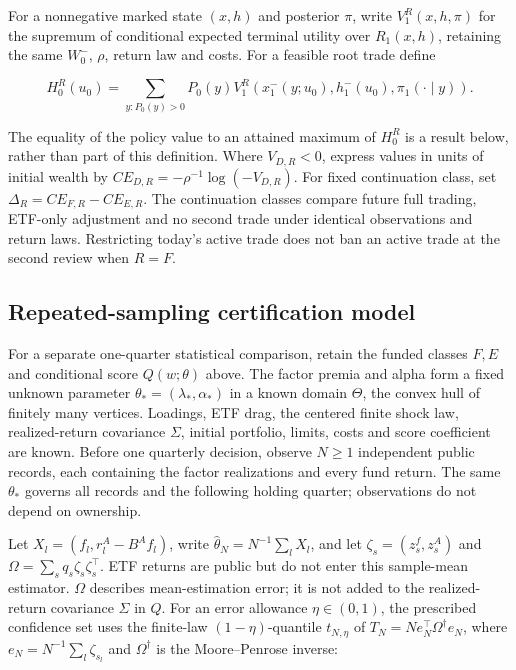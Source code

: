 \documentclass[11pt]{article}
\begin{document}
For a nonnegative marked state \((x,h)\) and posterior \(\pi\),
write \(V_1^R(x,h,\pi)\) for the supremum of conditional expected
terminal utility over \(R_1(x,h)\), retaining the same \(W_0^-\),
\(\rho\), return law and costs. For a feasible root trade define

\begin{equation*}
H_0^R(u_0)=
\sum_{y:P_0(y)>0}P_0(y)
V_1^R\!\left(x_1^-(y;u_0),h_1^-(u_0),
                  \pi_1(\cdot\mid y)\right).
\end{equation*}

The equality of the policy value to an attained maximum of
\(H_0^R\) is a result below, rather than part of this definition.
Where \(V_{D,R}<0\), express values in units of initial wealth by
\(CE_{D,R}=-\rho^{-1}\log(-V_{D,R})\). For fixed continuation
class, set \(\Delta_R=CE_{F,R}-CE_{E,R}\). The continuation
classes compare future full trading, ETF-only adjustment and
no second trade under identical observations and return laws.
Restricting today's active trade does not ban an active trade
at the second review when \(R=F\).

\subsection*{Repeated-sampling certification model}

For a separate one-quarter statistical comparison, retain the funded
classes \(F,E\) and conditional score \(Q(w;\theta)\) above. The
factor premia and alpha form a fixed unknown parameter
\(\theta_*=(\lambda_*,\alpha_*)\) in a known domain
\(\Theta\), the convex hull of finitely many vertices. Loadings,
ETF drag, the centered finite shock law,
realized-return covariance \(\Sigma\), initial portfolio, limits,
costs and score coefficient are known. Before one quarterly
decision, observe \(N\geq1\) independent public records, each
containing the factor realizations and every fund return. The
same \(\theta_*\) governs all records and the following holding
quarter; observations do not depend on ownership.

Let \(X_l=(f_l,r_l^A-B^Af_l)\), write
\(\widehat\theta_N=N^{-1}\sum_lX_l\), and let
\(\zeta_s=(z_s^f,z_s^A)\) and
\(\Omega=\sum_s q_s\zeta_s\zeta_s^\top\).
ETF returns are public but do not enter this sample-mean
estimator. \(\Omega\) describes mean-estimation error; it is
not added to the realized-return covariance \(\Sigma\) in
\(Q\). For an error allowance \(\eta\in(0,1)\), the prescribed
confidence set uses the finite-law \((1-\eta)\)-quantile
\(t_{N,\eta}\) of
\(T_N=N e_N^\top\Omega^\dagger e_N\), where
\(e_N=N^{-1}\sum_l\zeta_{s_l}\) and
\(\Omega^\dagger\) is the Moore--Penrose inverse:
\end{document}
